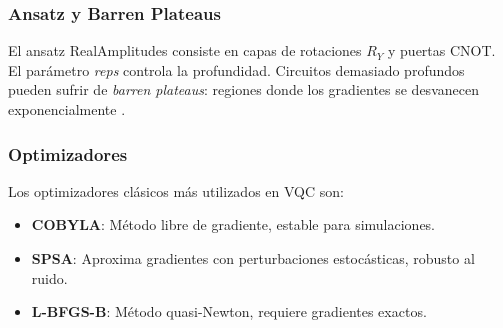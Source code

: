 \subsubsection{Ansatz y Barren Plateaus}
El ansatz RealAmplitudes consiste en capas de rotaciones $R_Y$ y puertas CNOT. El par\'ametro \textit{reps} controla la profundidad. Circuitos demasiado profundos pueden sufrir de \textit{barren plateaus}: regiones donde los gradientes se desvanecen exponencialmente \citep{cerezo2021}.

\subsubsection{Optimizadores}
Los optimizadores cl\'asicos m\'as utilizados en VQC son:
\begin{itemize}
    \item \textbf{COBYLA}: M\'etodo libre de gradiente, estable para simulaciones.
    \item \textbf{SPSA}: Aproxima gradientes con perturbaciones estoc\'asticas, robusto al ruido.
    \item \textbf{L-BFGS-B}: M\'etodo quasi-Newton, requiere gradientes exactos.
\end{itemize}
